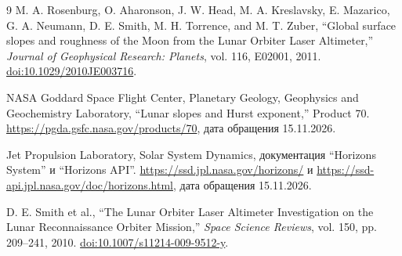 \documentclass[10pt,a4paper]{article}
\begin{document}
\begin{thebibliography}{9}
\small
{}
M. A. Rosenburg, O. Aharonson, J. W. Head, M. A. Kreslavsky, E. Mazarico, G. A. Neumann, D. E. Smith, M. H. Torrence, and M. T. Zuber, ``Global surface slopes and roughness of the Moon from the Lunar Orbiter Laser Altimeter,'' \emph{Journal of Geophysical Research: Planets}, vol. 116, E02001, 2011. \href{https://doi.org/10.1029/2010JE003716}{doi:10.1029/2010JE003716}.

NASA Goddard Space Flight Center, Planetary Geology, Geophysics and Geochemistry Laboratory, ``Lunar slopes and Hurst exponent,'' Product 70. \url{https://pgda.gsfc.nasa.gov/products/70}, дата обращения 15.11.2026.

Jet Propulsion Laboratory, Solar System Dynamics, документация ``Horizons System'' и ``Horizons API''. \url{https://ssd.jpl.nasa.gov/horizons/} и \url{https://ssd-api.jpl.nasa.gov/doc/horizons.html}, дата обращения 15.11.2026.

D. E. Smith et al., ``The Lunar Orbiter Laser Altimeter Investigation on the Lunar Reconnaissance Orbiter Mission,'' \emph{Space Science Reviews}, vol. 150, pp. 209--241, 2010. \href{https://doi.org/10.1007/s11214-009-9512-y}{doi:10.1007/s11214-009-9512-y}.
\end{thebibliography}
\end{document}
